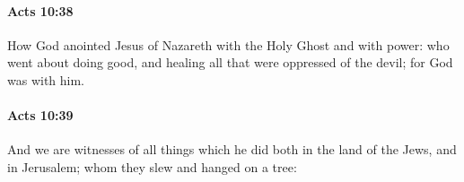 		\paragraph{Acts 10:38} %
			\label{ACTS-10-38}

			How God anointed Jesus of Nazareth with the Holy Ghost and with power: who went about doing good, and healing all that were oppressed of the devil; for God was with him.

			\begin{framed}
			\scriptsize
				\begin{compactdesc}
					\item[SBLG] 
				\end{compactdesc}
			\end{framed}

		\paragraph{Acts 10:39} %
			\label{ACTS-10-39}

			And we are witnesses of all things which he did both in the land of the Jews, and in Jerusalem; whom they slew and hanged on a tree:

